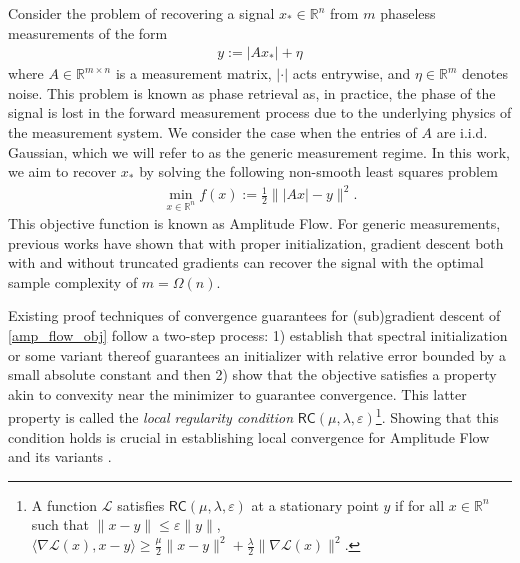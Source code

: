 \documentclass[11pt]{article}
\newcommand{\R}{\mathbb{R}}
\newcommand{\Lcal}{\mathcal{L}}
\newcommand{\RC}{\mathsf{R}\mathsf{C}}
\renewcommand{\epsilon}{\varepsilon}
\begin{document}
Consider the problem of recovering a signal $x_* \in \R^n$ from $m$ phaseless measurements of the form \begin{align*}
    y := |Ax_*| + \eta
\end{align*} where $A \in \R^{m \times n}$ is a measurement matrix, $|\cdot|$ acts entrywise, and $\eta \in \R^m$ denotes noise. This problem is known as phase retrieval as, in practice, the phase of the signal is lost in the forward measurement process due to the underlying physics of the measurement system. We consider the case when the entries of $A$ are i.i.d. Gaussian, which we will refer to as the generic measurement regime. In this work, we aim to recover $x_*$ by solving the following non-smooth least squares problem \begin{align}
    \min_{x \in \R^n} f(x) := \frac{1}{2}\big\||Ax| - y\big\|^2. \label{amp_flow_obj}
\end{align} This objective function is known as Amplitude Flow.  For generic measurements, previous works have shown that with proper initialization, gradient descent both with \cite{Wang2018} and without \cite{AmpFlow} truncated gradients can recover the signal with the optimal sample complexity of $m = \Omega(n)$.

Existing proof techniques of convergence guarantees for (sub)gradient descent of \eqref{amp_flow_obj} follow a two-step process: 1) establish that spectral initialization or some variant thereof guarantees an initializer with relative error bounded by a small absolute constant and then 2) show that the objective satisfies a property akin to convexity near the minimizer to guarantee convergence. This latter property is called the \textit{local regularity condition} $\RC(\mu,\lambda,\epsilon)$\footnote{A function $\Lcal$ satisfies $\RC(\mu,\lambda,\epsilon)$ at a stationary point $y$ if for all $x \in \R^n$ such that $\|x-y\|\leqslant\epsilon\|y\|$, $\langle \nabla \Lcal(x),x-y\rangle \geqslant \frac{\mu}{2}\|x-y\|^2 + \frac{\lambda}{2}\|\nabla \Lcal(x)\|^2.$}. Showing that this condition holds is crucial in establishing local convergence for Amplitude Flow \cite{AmpFlow, Wang2018} and its variants \cite{SmoothAmpFlow}.
\end{document}
